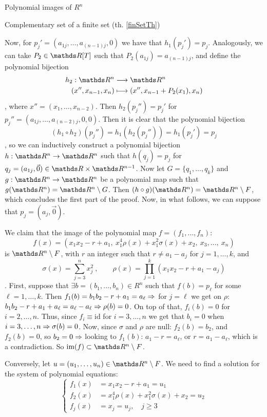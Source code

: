 \documentclass[11pt, a4paper, english, twoside, notitlepage]{report}
\begin{document}
\begin{chapter}{Polynomial images of $R^n$}
\begin{section}{Complementary set of a finite set (th. \ref{finSetTh})}
\begin{Proof}
		Now, for $p_j'=(a_{1j},\dots,a_{(n-1)j},0)$ we have that $h_1(p_j') = p_j$. Analogously, we can take $P_2\in\R[T]$ such that $P_2(a_{1j}) = a_{(n-1)j}$, and define the polynomial bijection
		\begin{align*}
			h_2: \R^n & \longrightarrow \R^n \\
			(x'',x_{n-1},x_n) & \longmapsto (x'',x_{n-1}+P_2(x_1),x_n)
		\end{align*}
		, where $x'' = (x_1, \dots, x_{n-2})$. Then $h_2(p_j'')=p_j'$ for $p_j'' = (a_{1j},\dots,a_{(n-2)j}, 0, 0)$. Then it is clear that the polynomial bijection 
		$$(h_1\circ h_2)(p_j'') = h_1(h_2(p_j'')) = h_1(p_j') = p_j$$
		, so we can inductively construct a polynomial bijection $h:\R^n\rightarrow\R^n$ such that $h(q_j)=p_j$ for $q_j=(a_{1j},\vec{0}) \in \R\times\R^{n-1}$.  Now let $G=\{q_1,\dots,q_k\}$ and $g:\R^n\rightarrow\R^n$ be a polynomial map such that $g(\R^n)=\R^n\setminus G$. Then $(h\circ g)(\R^n) = \R^n \setminus F$, which concludes the first part of the proof. Now, in what follows, we can suppose that $p_j=(a_j,\vec{0})$.
		
		We claim that the image of the polynomial map $f=(f_1,\dots,f_n)$:
		$$
		f(x)=\left(x_1x_2-r+a_1,\ x_1^{4}\rho(x)+x_1^{2}\sigma(x)+x_2,\ x_3,\dots,\ x_n\right)
		$$
		is $\R^n\setminus F$, with $r$ an integer such that $r \neq a_1 - a_j$ for $j=1, \dots, k$, and 
		$$
		\sigma(x)=\sum_{j=3}^n x_j^2\ , \qquad
		\rho(x)=\prod_{j=1}^k(x_1x_2-r+a_1-a_j)
		$$
		. First, suppose that $\exists b=(b_{1},\dots,b_{n}) \in R^n$ such that $f(b)=p_\ell$ for some $\ell=1, \dots, k$. Then $f_1(b)=b_1b_2 - r + a_1 = a_\ell \Rightarrow$ for $j = \ell$ we get on $\rho$: $b_1b_2 - r + a_1 + a_\ell = a_\ell - a_\ell \Rightarrow \rho(b) = 0$. On top of that, $f_i(b)=0$ for $i = 2, \dots, n$. Thus, since $f_i \equiv \text{id}$ for $i = 3, \dots, n$ we get that $b_i = 0$ when $i = 3, \dots, n \Rightarrow \sigma(b) = 0$. Now, since $\sigma$ and $\rho$ are null: $f_2(b) = b_2$, and $f_2(b) = 0$, so $b_2 = 0 \Rightarrow$ looking to $f_1(b)$: $a_1 - r = a_\ell$, or $r = a_1-a_\ell$, which is a contradiction. So $\text{im}(f)\subset \R^n\setminus F$.
				
		Conversely, let $u=(u_1,\dots,u_n)\in\R^n\setminus F$. We need to find a solution for the system of polynomial equations:
		\[ \left\{ 
		\begin{array}{ll} 	
			f_1(x) & = x_1 x_2 - r + a_1 = u_1 \\
			f_2(x) & = x_1^4 \rho(x) + x_1^2 \sigma(x) + x_2 = u_2 \\
			f_j(x) & = x_j = u_j, \quad j \geq 3
		\end{array} 
		\right.  \]
		\begin{enumerate}[(i)]
		

\end{enumerate}
\end{Proof}
\end{section}
\end{chapter}
\end{document}
